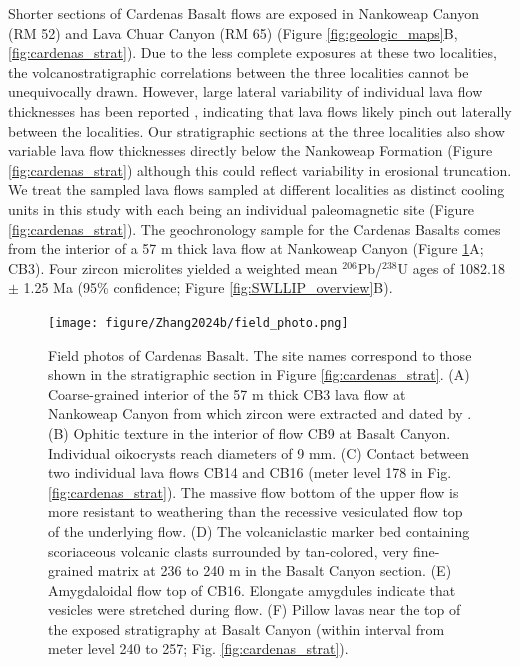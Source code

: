 Shorter sections of Cardenas Basalt flows are exposed in Nankoweap Canyon (RM 52) and Lava Chuar Canyon (RM 65) (Figure \ref{fig:geologic_maps}B, \ref{fig:cardenas_strat}). Due to the less complete exposures at these two localities, the volcanostratigraphic correlations between the three localities cannot be unequivocally drawn. However, large lateral variability of individual lava flow thicknesses has been reported \citep{Lucchitta1983a}, indicating that lava flows likely pinch out laterally between the localities. Our stratigraphic sections at the three localities also show variable lava flow thicknesses directly below the Nankoweap Formation (Figure \ref{fig:cardenas_strat}) although this could reflect variability in erosional truncation. We treat the sampled lava flows sampled at different localities as distinct cooling units in this study with each being an individual paleomagnetic site (Figure \ref{fig:cardenas_strat}). The \cite{Mohr2024a} geochronology sample for the Cardenas Basalts comes from the interior of a 57 m thick lava flow at Nankoweap Canyon (Figure \ref{fig:field_photo}A; CB3). Four zircon microlites yielded a weighted mean $^{206}$Pb/$^{238}$U ages of 1082.18 $\pm$ 1.25 Ma (95\% confidence; Figure \ref{fig:SWLLIP_overview}B). 

\begin{figure}[h!]
\centering
\texttt{[image: figure/Zhang2024b/field\_photo.png]}
\caption[Field photos of Cardenas Basalt]{Field photos of Cardenas Basalt. The site names correspond to those shown in the stratigraphic section in Figure \ref{fig:cardenas_strat}. (A) Coarse-grained interior of the 57 m thick CB3 lava flow at Nankoweap Canyon from which zircon were extracted and dated by \cite{Mohr2024a}. (B) Ophitic texture in the interior of flow CB9 at Basalt Canyon. Individual oikocrysts reach diameters of 9 mm. (C) Contact between two individual lava flows CB14 and CB16 (meter level 178 in Fig. \ref{fig:cardenas_strat}). The massive flow bottom of the upper flow is more resistant to weathering than the recessive vesiculated flow top of the underlying flow. (D) The volcaniclastic marker bed containing scoriaceous volcanic clasts surrounded by tan-colored, very fine-grained matrix at 236 to 240 m in the Basalt Canyon section. (E) Amygdaloidal flow top of CB16. Elongate amygdules indicate that vesicles were stretched during flow. (F) Pillow lavas near the top of the exposed stratigraphy at Basalt Canyon (within interval from meter level 240 to 257; Fig. \ref{fig:cardenas_strat}). }
\label{fig:field_photo}
\end{figure}

